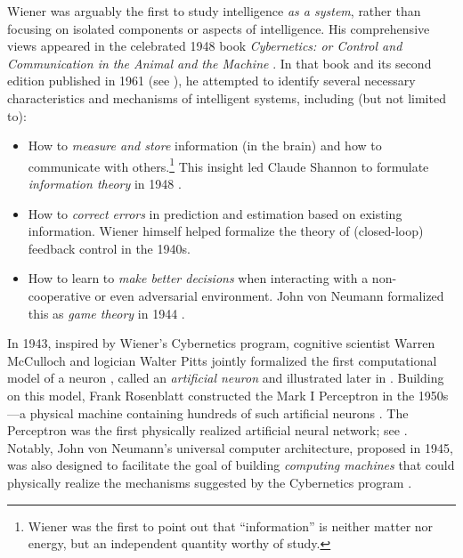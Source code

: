 \documentclass[../../book-main.tex]{subfiles}
\begin{document}
Wiener was arguably the first to study intelligence \textit{as a system}, rather than focusing on isolated components or aspects of intelligence. His comprehensive views appeared in the celebrated 1948 book \textit{Cybernetics: or Control and Communication in the Animal and the Machine} \cite{Wiener-Cybernetics-1948}. In that book and its second edition published in 1961 \cite{Wiener-Cybernetics-1961} (see ), he attempted to identify several necessary characteristics and mechanisms of intelligent systems, including (but not limited to):
\begin{itemize}
    \item How to \textit{measure and store} information (in the brain) and how to communicate with others.\footnote{Wiener was the first to point out that ``information'' is neither matter nor energy, but an independent quantity worthy of study.} This insight led Claude Shannon to formulate \textit{information theory} in 1948 \cite{Shannon-1948}.
    \item How to \textit{correct errors} in prediction and estimation based on existing information. Wiener himself helped formalize the theory of (closed-loop) feedback control in the 1940s.
    \item How to learn to \textit{make better decisions} when interacting with a non-cooperative or even adversarial environment. John von Neumann formalized this as \textit{game theory} in 1944 \cite{von-Neumann-1944}.
\end{itemize}
In 1943, inspired by Wiener's Cybernetics program, cognitive scientist Warren McCulloch and logician Walter Pitts jointly formalized the first computational model of a neuron \cite{McCulloch-Pitts}, called an \textit{artificial neuron} and illustrated later in . Building on this model, Frank Rosenblatt constructed the Mark I Perceptron in the 1950s---a physical machine containing hundreds of such artificial neurons \cite{Rosenblatt:1957}. The Perceptron was the first physically realized artificial neural network; see . Notably, John von Neumann's universal computer architecture, proposed in 1945, was also designed to facilitate the goal of building \textit{computing machines} that could physically realize the mechanisms suggested by the Cybernetics program \cite{von-Neumann-1958}.
\end{document}
